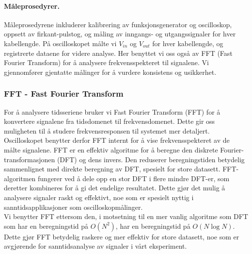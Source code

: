 \paragraph{Måleprosedyrer.}
Måleprosedyrene inkluderer kalibrering av funksjonsgenerator og oscilloskop, oppsett av firkant-pulstog, og måling av inngangs- og utgangssignaler for hver kabellengde. På oscilloskopet målte vi $V_{in}$ og $V_{out}$ for hver kabellengde, og registrerte dataene for videre analyse. Her benyttet vi oss også av FFT (Fast Fourier Transform) for å analysere frekvensspekteret til signalene. Vi gjennomfører gjentatte målinger for å vurdere konsistens og usikkerhet.

\subsubsection{FFT - Fast Fourier Transform}
For å analysere tidsseriene bruker vi Fast Fourier Transform (FFT) for å konvertere signalene fra tidsdomenet til frekvensdomenet. Dette gir oss muligheten til å studere frekvensresponsen til systemet mer detaljert. Oscilloskopet benytter derfor FFT internt for å vise frekvensspekteret av de målte signalene.
FFT er en effektiv algoritme for å beregne den diskrete Fourier-transformasjonen (DFT) og dens invers. Den reduserer beregningstiden betydelig sammenlignet med direkte beregning av DFT, spesielt for store datasett. FFT-algoritmen fungerer ved å dele opp en stor DFT i flere mindre DFT-er, som deretter kombineres for å gi det endelige resultatet. Dette gjør det mulig å analysere signaler raskt og effektivt, noe som er spesielt nyttig i sanntidsapplikasjoner som oscilloskopmålinger. \\ Vi benytter FFT ettersom den, i motsetning til en mer vanlig algoritme som DFT som har en beregningstid på $O(N^2)$, har en beregningstid på $O(N \log N)$. Dette gjør FFT betydelig raskere og mer effektiv for store datasett, noe som er avgjørende for sanntidsanalyse av signaler i vårt eksperiment.